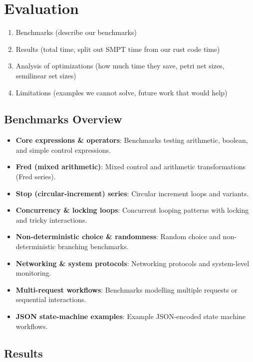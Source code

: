 \section{Evaluation}
\label{sec:evaluation}

\begin{enumerate}
    \item Benchmarks (describe our benchmarks)
    \item Results (total time, split out SMPT time from our rust code time)
    \item Analysis of optimizations (how much time they save, petri net sizes, semilinear set sizes)
    \item Limitations (examples we cannot solve, future work that would help)
\end{enumerate}


\subsection{Benchmarks Overview}
\label{subsec:benchmarks}

\begin{itemize}
	\item \textbf{Core expressions \& operators}: Benchmarks testing arithmetic, boolean, and simple control expressions.
	\item \textbf{Fred (mixed arithmetic)}: Mixed control and arithmetic transformations (Fred series).
	\item \textbf{Stop (circular-increment) series}: Circular increment loops and variants.
	\item \textbf{Concurrency \& locking loops}: Concurrent looping patterns with locking and tricky interactions.
	\item \textbf{Non-deterministic choice \& randomness}: Random choice and non-deterministic branching benchmarks.
	\item \textbf{Networking \& system protocols}: Networking protocols and system-level monitoring.
	\item \textbf{Multi-request workflows}: Benchmarks modelling multiple requests or sequential interactions.
	\item \textbf{JSON state-machine examples}: Example JSON-encoded state machine workflows.
\end{itemize}


\subsection{Results}

